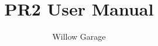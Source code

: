 \documentclass[12pt,oneside,letterpaper]{memoir}
\begin{document}
\title{PR2 User Manual}
\author{Willow Garage}
\newcommand{\TODO}[1]{\textcolor{red}{TODO: #1}}
\maketitle

\cleardoublepage
\setcounter{tocdepth}{2}
\tableofcontents

\mainmatter
\setcounter{secnumdepth}{2}
\end{document}
